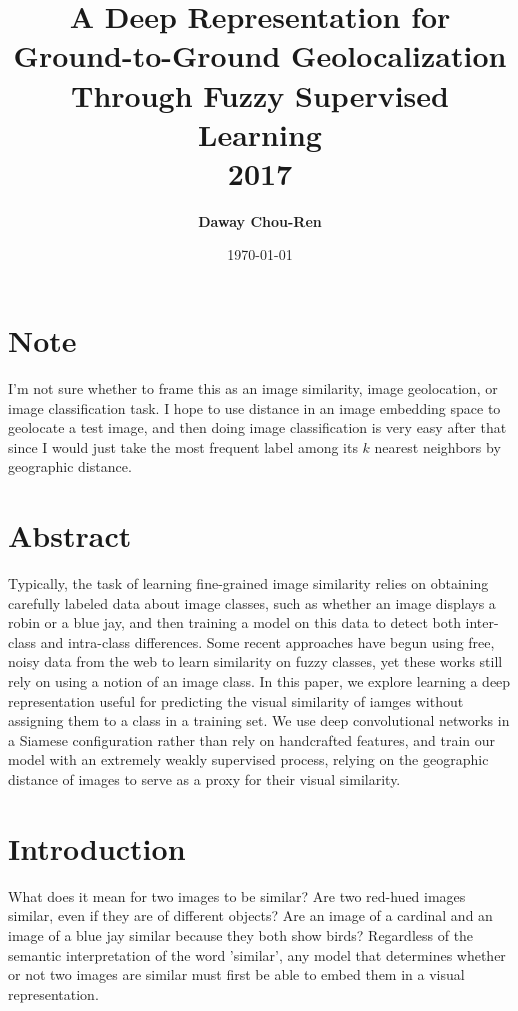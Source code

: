 \documentclass[pageno]{jpaper}
\title{\bf A Deep Representation for Ground-to-Ground Geolocalization Through Fuzzy Supervised Learning\\[2ex] 
       \rm\normalsize 2017}
\date{\today}
\author{\bf Daway Chou-Ren}
\begin{document}
\maketitle

\thispagestyle{empty}
\doublespacing

\section{Note}
I'm not sure whether to frame this as an image similarity, image geolocation, or image classification task. I hope to use distance in an image embedding space to geolocate a test image, and then doing image classification is very easy after that since I would just take the most frequent label among its $k$ nearest neighbors by geographic distance.

\section{Abstract}
Typically, the task of learning fine-grained image similarity relies on obtaining carefully labeled data about image classes, such as whether an image displays a robin or a blue jay, and then training a model on this data to detect both inter-class and intra-class differences. Some recent approaches have begun using free, noisy data from the web to learn similarity on fuzzy classes, yet these works still rely on using a notion of an image class. In this paper, we explore learning a deep representation useful for predicting the visual similarity of iamges without assigning them to a class in a training set. We use deep convolutional networks in a Siamese configuration rather than rely on handcrafted features, and train our model with an extremely weakly supervised process, relying on the geographic distance of images to serve as a proxy for their visual similarity. 

\section{Introduction}
What does it mean for two images to be similar? Are two red-hued images similar, even if they are of different objects? Are an image of a cardinal and an image of a blue jay similar because they both show birds? Regardless of the semantic interpretation of the word 'similar', any model that determines whether or not two images are similar must first be able to embed them in a visual representation.\\
\end{document}
